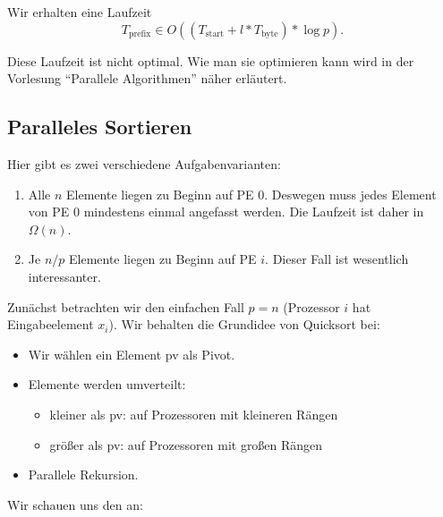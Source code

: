 Wir erhalten eine Laufzeit
\begin{equation*}
  T_\text{prefix} \in O((T_\text{start} + l * T_\text{byte}) * \log p)\text{.}
\end{equation*}

Diese Laufzeit ist nicht optimal. Wie man sie optimieren kann wird in der Vorlesung ``Parallele Algorithmen'' näher erläutert.

\subsection{Paralleles Sortieren}

Hier gibt es zwei verschiedene Aufgabenvarianten:

\begin{enumerate}
  \item Alle \( n \) Elemente liegen zu Beginn auf PE 0. Deswegen muss jedes Element von PE 0 mindestens einmal angefasst werden. Die Laufzeit ist daher in \( \Omega(n) \).
  \item Je \( n/p \) Elemente liegen zu Beginn auf PE \( i \). Dieser Fall ist wesentlich interessanter.
\end{enumerate}

Zunächst betrachten wir den einfachen Fall \( p = n \) (Prozessor \( i \) hat Eingabeelement \( x_i \)). Wir behalten die Grundidee von Quicksort bei:
\begin{itemize}
  \item Wir wählen ein Element pv als Pivot.
  \item Elemente werden umverteilt:
  \begin{itemize}
    \item kleiner als pv: auf Prozessoren mit kleineren Rängen
    \item größer als pv: auf Prozessoren mit großen Rängen
  \end{itemize}
  \item Parallele Rekursion.
\end{itemize}

Wir schauen uns den  an:

